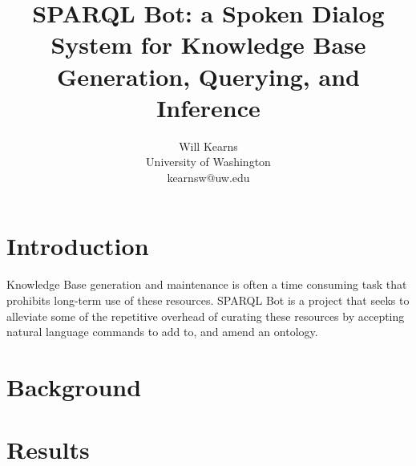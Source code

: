 \documentclass[11pt]{article}
\title{SPARQL Bot: a Spoken Dialog System for Knowledge Base Generation, Querying, and Inference}
\author{Will Kearns \\ 
University of Washington \\ 
kearnsw@uw.edu}
\begin{document}
\maketitle

\section{Introduction}
Knowledge Base generation and maintenance is often a time consuming task that prohibits long-term use of these resources. SPARQL Bot is a project that seeks to alleviate some of the repetitive overhead of curating these resources by accepting natural language commands to add to, and amend an ontology. 

\section{Background}

\section{Results}
\end{document}
